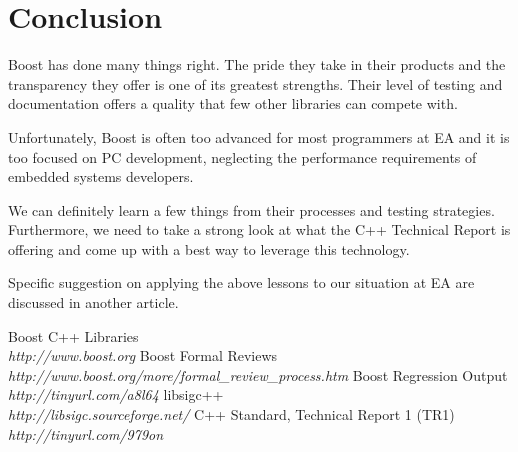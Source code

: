 \documentclass[twocolumn]{paper}
\begin{document}
\section{Conclusion}

Boost has done many things right. The pride they take in their
products and the transparency they offer is one of its greatest
strengths. Their level of testing and documentation offers a quality
that few other libraries can compete with.

Unfortunately, Boost is often too advanced for most programmers at
EA and it is too focused on PC development, neglecting the
performance requirements of embedded systems developers.

We can definitely learn a few things from their processes and
testing strategies. Furthermore, we need to take a strong look at
what the C++ Technical Report \cite{bib:tr1} is offering and come up
with a best way to leverage this technology.

Specific suggestion on applying the above lessons to our situation
at EA are discussed in another article.

\begin{thebibliography}{99}

    Boost C++ Libraries\\ \emph{http://www.boost.org}
    Boost Formal Reviews\\ \emph{http://www.boost.org/more/formal\_review\_process.htm}
    Boost Regression Output\\ \emph{http://tinyurl.com/a8l64}
    libsigc++\\ \emph{http://libsigc.sourceforge.net/}
    C++ Standard, Technical Report 1 (TR1)\\
    \emph{http://tinyurl.com/979on}

\end{thebibliography}
\end{document}
